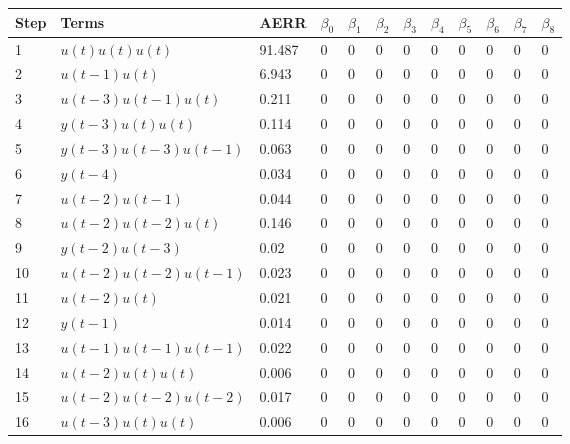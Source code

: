 \begin{tabular}{llllllllllll}
Step & Terms & AERR & $\beta_{0}$ & $\beta_{1}$ & $\beta_{2}$ & $\beta_{3}$ & $\beta_{4}$ & $\beta_{5}$ & $\beta_{6}$ & $\beta_{7}$ & $\beta_{8}$ \\ 
\hline 
1 & $u(t)u(t)u(t)$ & 91.487 & 0 & 0 & 0 & 0 & 0 & 0 & 0 & 0 & 0 \\ 
2 & $u(t-1)u(t)$ & 6.943 & 0 & 0 & 0 & 0 & 0 & 0 & 0 & 0 & 0 \\ 
3 & $u(t-3)u(t-1)u(t)$ & 0.211 & 0 & 0 & 0 & 0 & 0 & 0 & 0 & 0 & 0 \\ 
4 & $y(t-3)u(t)u(t)$ & 0.114 & 0 & 0 & 0 & 0 & 0 & 0 & 0 & 0 & 0 \\ 
5 & $y(t-3)u(t-3)u(t-1)$ & 0.063 & 0 & 0 & 0 & 0 & 0 & 0 & 0 & 0 & 0 \\ 
6 & $y(t-4)$ & 0.034 & 0 & 0 & 0 & 0 & 0 & 0 & 0 & 0 & 0 \\ 
7 & $u(t-2)u(t-1)$ & 0.044 & 0 & 0 & 0 & 0 & 0 & 0 & 0 & 0 & 0 \\ 
8 & $u(t-2)u(t-2)u(t)$ & 0.146 & 0 & 0 & 0 & 0 & 0 & 0 & 0 & 0 & 0 \\ 
9 & $y(t-2)u(t-3)$ & 0.02 & 0 & 0 & 0 & 0 & 0 & 0 & 0 & 0 & 0 \\ 
10 & $u(t-2)u(t-2)u(t-1)$ & 0.023 & 0 & 0 & 0 & 0 & 0 & 0 & 0 & 0 & 0 \\ 
11 & $u(t-2)u(t)$ & 0.021 & 0 & 0 & 0 & 0 & 0 & 0 & 0 & 0 & 0 \\ 
12 & $y(t-1)$ & 0.014 & 0 & 0 & 0 & 0 & 0 & 0 & 0 & 0 & 0 \\ 
13 & $u(t-1)u(t-1)u(t-1)$ & 0.022 & 0 & 0 & 0 & 0 & 0 & 0 & 0 & 0 & 0 \\ 
14 & $u(t-2)u(t)u(t)$ & 0.006 & 0 & 0 & 0 & 0 & 0 & 0 & 0 & 0 & 0 \\ 
15 & $u(t-2)u(t-2)u(t-2)$ & 0.017 & 0 & 0 & 0 & 0 & 0 & 0 & 0 & 0 & 0 \\ 
16 & $u(t-3)u(t)u(t)$ & 0.006 & 0 & 0 & 0 & 0 & 0 & 0 & 0 & 0 & 0 \\ 
\hline 
\end{tabular}